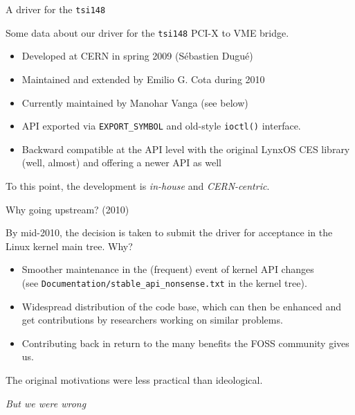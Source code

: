 \documentclass{beamer}
\begin{document}
\begin{frame}{A driver for the \texttt{tsi148}}

Some data about our driver for the \texttt{tsi148} PCI-X to VME bridge.
\begin{itemize}
\item Developed at CERN in spring 2009 (S\'ebastien Dugu\'e)
\item Maintained and extended by Emilio G. Cota during 2010
\item Currently maintained by Manohar Vanga (see below)
\item API exported via \texttt{EXPORT\_SYMBOL} and old-style \texttt{ioctl()}
    interface.
\item Backward compatible at the API level with the original LynxOS CES
    library (well, almost) and offering a newer API as well
\end{itemize}

To this point, the development is \emph{in-house} and
\emph{CERN-centric}.
\end{frame}

\begin{frame}{Why going upstream? (2010)}

By mid-2010, the decision is taken to submit the driver for acceptance
in the Linux kernel main tree. Why?

\begin{itemize}
\item Smoother maintenance in the (frequent) event of kernel API
  changes\\
  (see \texttt{Documentation/stable\_api\_nonsense.txt} in the kernel
  tree).
\item Widespread distribution of the code base, which can then be
    enhanced and get contributions by researchers working on similar
    problems.
\item Contributing back in return to the many benefits the FOSS community
    gives us.
\end{itemize}

The original motivations were less practical than ideological.

\emph{But we were wrong}
\end{frame}
\end{document}
